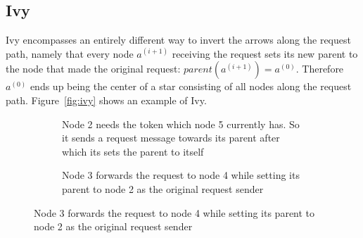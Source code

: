 \documentclass[a4paper, oneside]{discothesis}
\begin{document}
\newpage
\subsection{Ivy}
\label{intro:ivy}

Ivy encompasses an entirely different way to invert the arrows along the request path, namely that every node $a^{(i+1)}$ receiving the request sets its new parent to the node that made the original request: $parent(a^{(i+1)})=a^{(0)}$. Therefore $a^{(0)}$ ends up being the center of a star consisting of all nodes along the request path. Figure~\ref{fig:ivy} shows an example of Ivy.

\begin{figure}[H]
\begin{subfigure}[t]{0.5\textwidth}
\centering
{}
\caption{Node 2 needs the token which node 5 currently has. So it sends a request message towards its parent after which its sets the parent to itself}
\end{subfigure}
\quad
\begin{subfigure}[t]{0.5\textwidth}
\centering
{}
\caption{Node 3 forwards the request to node 4 while setting its parent to node 2 as the original request sender}
\end{subfigure}


\end{figure}
\end{document}
